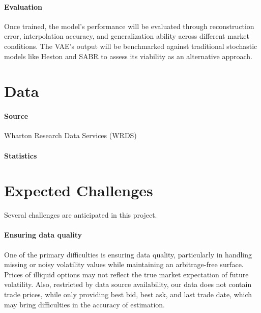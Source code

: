 \documentclass{article}
\newcommand{\todo}[1]{\fbox{\textcolor{red}{\bfseries #1} }}%
\begin{document}
\paragraph{Evaluation} Once trained, the model’s performance will be evaluated through reconstruction error, interpolation accuracy, and generalization ability across different market conditions. The VAE’s output will be benchmarked against traditional stochastic models like Heston \cite{wolfram_volsurface_heston} and SABR \cite{wolfram_volsurface_sabr} to assess its viability as an alternative approach.

\section{Data}
\paragraph{Source} Wharton Research Data Services (WRDS) \todo{Detailed description}
\paragraph{Statistics}  \todo{Add statistics here}




\section{Expected Challenges}

Several challenges are anticipated in this project.
\paragraph{Ensuring data quality}
One of the primary difficulties is ensuring data quality, particularly in handling missing or noisy volatility values while maintaining an arbitrage-free surface. Prices of illiquid options may not reflect the true market expectation of future volatility. Also, restricted by data source availability, our data does not contain trade prices, while only providing best bid, best ask, and last trade date, which may bring difficulties in the accuracy of estimation.
\end{document}
